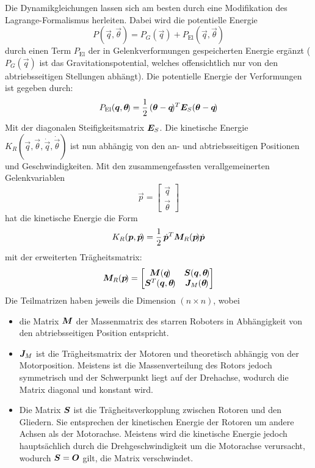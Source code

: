 				Die Dynamikgleichungen lassen sich am besten durch eine Modifikation des Lagrange-Formalismus herleiten. Dabei wird die potentielle Energie
				\begin{equation*}
					P(\vec{q}, \vec{\theta}\!) = P_G(\vec{q}\!) + P_\text{El}(\vec{q}, \vec{\theta}\!)
				\end{equation*}
				durch einen Term \( P_\text{El} \) der in Gelenkverformungen gespeicherten Energie ergänzt (\(P_G(\vec{q}\!)\) ist das Gravitationspotential, welches offensichtlich nur von den abtriebsseitigen Stellungen abhängt). Die potentielle Energie der Verformungen ist gegeben durch:
				\begin{equation*}
					P_\text{El}(\bm{q}, \bm{\theta}\!) = \frac{1}{2} \, (\bm{\theta} - \bm{q}\!)^T \bm{E}_S (\bm{\theta} - \bm{q}\!)
				\end{equation*}
				Mit der diagonalen Steifigkeitsmatrix \( \bm{E}_S \). Die kinetische Energie \( K_R(\vec{q}, \vec{\theta}, \dot{\vec{q}}, \dot{\vec{\theta}}\!) \) ist nun abhängig von den an- und abtriebsseitigen Positionen und Geschwindigkeiten. Mit den zusammengefassten verallgemeinerten Gelenkvariablen
				\begin{equation*}
					\vec{p} =
					\begin{bmatrix}
						\vec{q} \\
						\vec{\theta}
					\end{bmatrix}
				\end{equation*}
				hat die kinetische Energie die Form
				\begin{equation*}
					K_R(\bm{p}, \dot{\bm{p}}\!) = \frac{1}{2} \, \dot{\bm{p}}^T \bm{M}_R(\bm{p}\!) \dot{\bm{p}}
				\end{equation*}
				mit der erweiterten Trägheitsmatrix:
				\begin{equation*}
					\bm{M}_R(\bm{p}\!) =
					\begin{bmatrix}
						\bm{M}(\bm{q}\!)                 & \bm{S}(\bm{q}, \bm{\theta}\!) \\
						\bm{S}^T(\bm{q}, \bm{\theta}\!) & \bm{J}_M(\bm{\theta}\!)
					\end{bmatrix}
				\end{equation*}
				Die Teilmatrizen haben jeweils die Dimension \( (n \times n) \), wobei
				\begin{itemize}
					\item die Matrix \( \bm{M} \) der Massenmatrix des starren Roboters in Abhängigkeit von den abtriebsseitigen Position entspricht.
					\item \( \bm{J}_M \) ist die Trägheitsmatrix der Motoren und theoretisch abhängig von der Motorposition. Meistens ist die Massenverteilung des Rotors jedoch symmetrisch und der Schwerpunkt liegt auf der Drehachse, wodurch die Matrix diagonal und konstant wird.
					\item Die Matrix \( \bm{S} \) ist die Trägheitsverkopplung zwischen Rotoren und den Gliedern. Sie entsprechen der kinetischen Energie der Rotoren um andere Achsen als der Motorachse. Meistens wird die kinetische Energie jedoch hauptsächlich durch die Drehgeschwindigkeit um die Motorachse verursacht, wodurch \( \bm{S} = \bm{O} \) gilt, \dh die Matrix verschwindet.
				\end{itemize}
